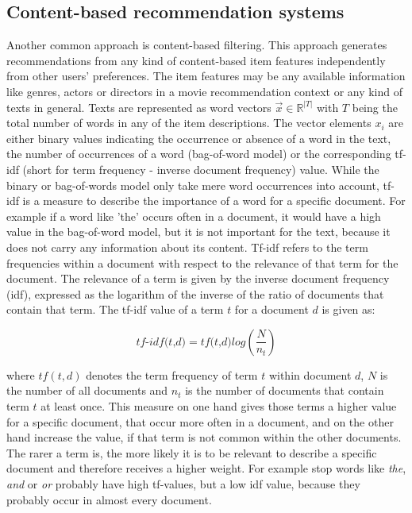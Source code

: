 \documentclass[10pt]{reportMaster}
\begin{document}


\subsection{Content-based recommendation systems}
\label{rs_cb}

Another common approach is content-based filtering.
This approach generates recommendations from any kind of content-based item features independently from other users' preferences.
The item features may be any available information like genres, actors or directors in a movie recommendation context or any kind of texts in general.
Texts are represented as word vectors $\vec{x} \in \mathds{R}^{|T|}$ with $T$ being the total number of words in any of the item descriptions.
The vector elements $x_i$ are either binary values indicating the occurrence or absence of a word in the text, the number of occurrences of a word (bag-of-word model) or the corresponding tf-idf (short for term frequency - inverse document frequency) value.
While the binary or bag-of-words model only take mere word occurrences into account, tf-idf is a measure to describe the importance of a word for a specific document.
For example if a word like 'the' occurs often in a document, it would have a high value in the bag-of-word model, but it is not important for the text, because it does not carry any information about its content.
Tf-idf refers to the term frequencies within a document with respect to the relevance of that term for the document.
The relevance of a term is given by the inverse document frequency (idf), expressed as the logarithm of the inverse of the ratio of documents that contain that term.
The tf-idf value of a term $t$ for a document $d$ is given as:

\begin{equation}
	\textit{tf-idf(t,d)} = \textit{tf(t,d)} log(\frac{N}{n_t})
\end{equation}

where $tf(t,d)$ denotes the term frequency of term $t$ within document $d$, $N$ is the number of all documents and $n_t$ is the number of documents that contain term $t$ at least once. 
This measure on one hand gives those terms a higher value for a specific document, that occur more often in a document, and on the other hand increase the value, if that term is not common within the other documents.
The rarer a term is, the more likely it is to be relevant to describe a specific document and therefore receives a higher weight.
For example stop words like \textit{the}, \textit{and} or \textit{or} probably have high tf-values, but a low idf value, because they probably occur in almost every document.
\end{document}
